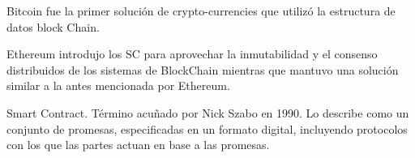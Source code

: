 Bitcoin fue la primer solución de crypto-currencies
que utilizó la estructura de datos block Chain.

Ethereum introdujo los SC para aprovechar la
inmutabilidad y el consenso distribuidos de los sistemas
de BlockChain mientras que mantuvo una solución similar
a la antes mencionada por Ethereum.


Smart Contract. Término acuñado por Nick Szabo en 1990.
Lo describe como un conjunto de promesas, especificadas en
un formato digital, incluyendo protocolos con los que las
partes actuan en base a las promesas.


